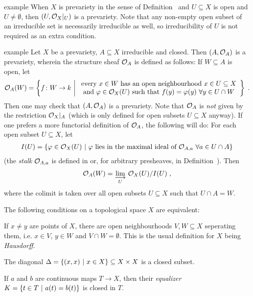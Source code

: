 \documentclass[a4paper,parskip=half,numbers=enddot, DIV=12]{scrreprt}
\begin{document}
\begin{varthm}{example}
 When $X$ is prevariety in the sense of Definition~ and $U\subseteq X$ is open and $U\neq \emptyset$, then $(U,\mathcal{O}_X|_U)$ is a prevariety. Note that any non-empty open subset of an irreducible set is necessarily irreducible as well, so irreducibility of $U$ is not required as an extra condition.
\end{varthm}
\begin{varthm}[b]{example}
 Let $X$ be a prevariety, $A\subseteq X$ irreducible and closed. Then $(A,\mathcal{O}_A)$ is a prevariety, wherein the structure sheaf $\mathcal{O}_A$ is defined as follows: If $W\subseteq A$ is open, let
 \begin{align*}
    \Oo_A(W) = \left\{ f\colon W\to k \st 
    \begin{array}{c}
	    \text{every } x\in W\text{ has an open neighbourhood } x\in U\subseteq X  \\
	    \text{and } \phi\in \Oo_X(U)\text{ such that } f(y) = \phi(y)\ \forall y\in U\cap W
    \end{array}\right\}\;.
 \end{align*}
 Then one may check that $(A,\mathcal{O}_A)$ is a prevariety. Note that $\mathcal{O}_A$ is \emph{not} given by the restriction $\mathcal{O}_X|_A$ (which is only defined for open subsets $U\subseteq X$ anyway). If one prefers a more functorial definition of $\mathcal{O}_A$, the following will do: For each open subset $U\subseteq X$, let 
 \begin{align*}
 	I(U)=\left\{\varphi\in\mathcal{O}_X(U)\ \middle|\  \varphi\text{ lies in the maximal ideal of }\mathcal{O}_{A,a}\ \forall a\in U\cap A\right\}
 \end{align*}
 (the \emph{stalk} $\mathcal{O}_{A,a}$ is defined in \cite[Definition 2.2.5]{alg1} or, for arbitrary presheaves, in Definition~). Then
 \begin{align*}
 	\Oo_A(W)=\colimit[U] \Oo_X(U)/I(U)\;,
 \end{align*}
	where the colimit is taken over all open subsets $U\subseteq X$ such that $U\cap A=W$.
\end{varthm}

\begin{rem*}
 The following conditions on a topological space $X$ are equivalent:
 \begin{alphanumerate}
  \item
    If $x\neq y$ are points of $X$, there are open neighbourhoods $V,W\subseteq X$ seperating them, i.e. $x\in V$, $y\in W$ and $V\cap W= \emptyset$. This is the usual definition for $X$ being \emph{Hausdorff}.
  \item
    The diagonal $\Delta = \left\{(x,x)\ \middle|\  x\in X\right\}\subseteq X\times X$ is a closed subset.
  \item 
    If $a$ and $b$ are continuous maps $T\to X$, then their \emph{equalizer} $K = \left\{t\in T\ \middle|\  a(t) = b(t)\right\}$ is closed in $T$.
 \end{alphanumerate}

\end{rem*}
\end{document}
